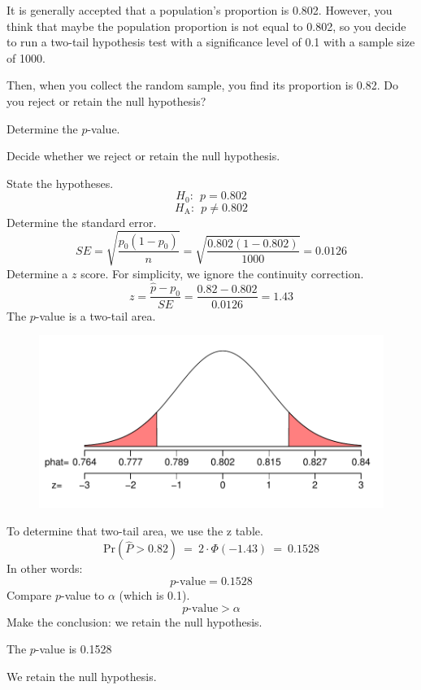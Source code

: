 
\begin{question}
It is generally accepted that a population's proportion is 0.802.
However, you think that maybe the population proportion is not equal to
0.802, so you decide to run a two-tail hypothesis test with a
significance level of 0.1 with a sample size of 1000.

Then, when you collect the random sample, you find its proportion is
0.82. Do you reject or retain the null hypothesis?
\begin{answerlist}
  \item Determine the \(p\)-value.
  \item Decide whether we reject or retain the null hypothesis.
\end{answerlist}
\end{question}

\begin{solution}
State the hypotheses. \[H_0: ~~ p = 0.802 \]
\[H_\text{A}: ~~ p \ne 0.802\] Determine the standard error.
\[SE = \sqrt{\frac{p_0(1-p_0)}{n}} = \sqrt{\frac{0.802(1-0.802)}{1000}} = 0.0126 \]
Determine a \(z\) score. For simplicity, we ignore the continuity
correction.
\[z = \frac{\hat{p}-p_0}{SE} = \frac{0.82-0.802}{0.0126} = 1.43 \] The
\(p\)-value is a two-tail area.

\begin{figure}
\centering
\includegraphics{p_single_test_twotail-1.pdf}
\caption{}
\end{figure}

To determine that two-tail area, we use the z table.
\[\text{Pr}\left(\hat{P} > 0.82\right) ~=~ 2\cdot \Phi(-1.43) ~=~ 0.1528 \]
In other words: \[p\text{-value} = 0.1528\] Compare \(p\)-value to
\(\alpha\) (which is 0.1). \[p\text{-value} > \alpha \] Make the
conclusion: we retain the null hypothesis.
\begin{answerlist}
  \item The \(p\)-value is 0.1528
  \item We retain the null hypothesis.
\end{answerlist}
\end{solution}

